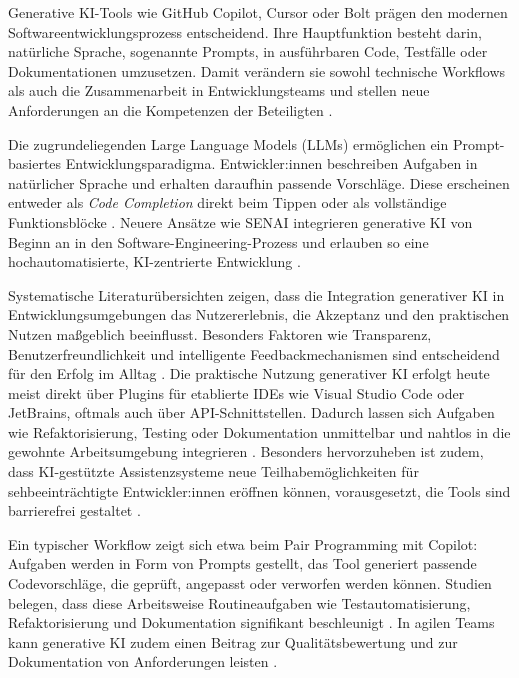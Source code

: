 \label{sec:generative-ki-tools}

Generative KI-Tools wie GitHub Copilot, Cursor oder Bolt prägen den modernen
Softwareentwicklungsprozess entscheidend. Ihre Hauptfunktion besteht darin,
natürliche Sprache, sogenannte Prompts, in ausführbaren Code, Testfälle oder
Dokumentationen umzusetzen. Damit verändern sie sowohl technische Workflows als
auch die Zusammenarbeit in Entwicklungsteams und stellen neue Anforderungen an
die Kompetenzen der Beteiligten \cite{weisz_design_2024}.

Die zugrundeliegenden Large Language Models (LLMs) ermöglichen ein
Prompt-basiertes Entwicklungsparadigma. Entwickler:innen beschreiben Aufgaben
in natürlicher Sprache und erhalten daraufhin passende Vorschläge. Diese
erscheinen entweder als \textit{Code Completion} direkt beim Tippen oder als
vollständige Funktionsblöcke \cite{kerr_github_nodate, weisz_design_2024}.
Neuere Ansätze wie SENAI integrieren generative KI von Beginn an in den
Software-Engineering-Prozess und erlauben so eine hochautomatisierte,
KI-zentrierte Entwicklung \cite{saad_senai_2025}.

Systematische Literaturübersichten zeigen, dass die Integration generativer KI
in Entwicklungsumgebungen das Nutzererlebnis, die Akzeptanz und den praktischen
Nutzen maßgeblich beeinflusst. Besonders Faktoren wie Transparenz,
Benutzerfreundlichkeit und intelligente Feedbackmechanismen sind entscheidend
für den Erfolg im Alltag \cite{sergeyuk_human-ai_2025}. Die praktische Nutzung
generativer KI erfolgt heute meist direkt über Plugins für etablierte IDEs wie
Visual Studio Code oder JetBrains, oftmals auch über API-Schnittstellen.
Dadurch lassen sich Aufgaben wie Refaktorisierung, Testing oder Dokumentation
unmittelbar und nahtlos in die gewohnte Arbeitsumgebung integrieren
\cite{kerr_github_nodate, shi_ai-assisted_2023, weisz_design_2024}. Besonders
hervorzuheben ist zudem, dass KI-gestützte Assistenzsysteme neue
Teilhabemöglichkeiten für sehbeeinträchtigte Entwickler:innen eröffnen können,
vorausgesetzt, die Tools sind barrierefrei gestaltet
\cite{flores-saviaga_impact_2025}.

Ein typischer Workflow zeigt sich etwa beim Pair Programming mit Copilot:
Aufgaben werden in Form von Prompts gestellt, das Tool generiert passende
Codevorschläge, die geprüft, angepasst oder verworfen werden können. Studien
belegen, dass diese Arbeitsweise Routineaufgaben wie Testautomatisierung,
Refaktorisierung und Dokumentation signifikant beschleunigt
\cite{kerr_github_nodate, weisz_design_2024, shi_ai-assisted_2023}. In agilen
Teams kann generative KI zudem einen Beitrag zur Qualitätsbewertung und zur
Dokumentation von Anforderungen leisten \cite{geyer_case_2025}.

